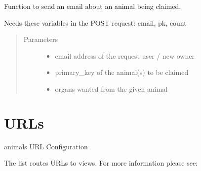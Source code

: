 \documentclass[letterpaper,10pt,openany,oneside,english]{sphinxmanual}
\begin{document}

\begin{fulllineitems}
\label{\detokenize{index:animals.views.send_email_organ}}
Function to send an email about an animal being claimed.

Needs these variables in the POST request: email, pk, count
\begin{quote}\begin{description}
\item[{Parameters}] \leavevmode\begin{itemize}
\item {} 
 \textendash{} email address of the request user / new owner

\item {} 
 \textendash{} primary\_key of the animal(s) to be claimed

\item {} 
 \textendash{} organs wanted from the given animal

\end{itemize}

\end{description}\end{quote}

\end{fulllineitems}



\section{URLs}
\label{\detokenize{index:module-animals.urls}}\label{\detokenize{index:urls}}
animals URL Configuration
\begin{description}
\item[{The  list routes URLs to views. For more information please see:}] \leavevmode
{}

\end{description}
\end{document}
